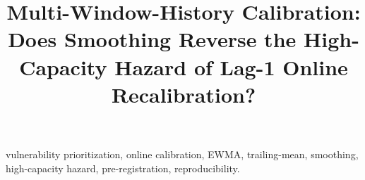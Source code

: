 \documentclass[journal]{IEEEtran}
\title{Multi-Window-History Calibration: Does Smoothing Reverse the
High-Capacity Hazard of Lag-1 Online Recalibration?}
\author{%
  \IEEEauthorblockN{Harshavardhan Malla}
  \IEEEauthorblockA{Independent Researcher}%
}
\begin{document}
\maketitle

\begin{abstract}

\end{abstract}

\begin{IEEEkeywords}
vulnerability prioritization, online calibration, EWMA, trailing-mean,
smoothing, high-capacity hazard, pre-registration, reproducibility.
\end{IEEEkeywords}












\end{document}
